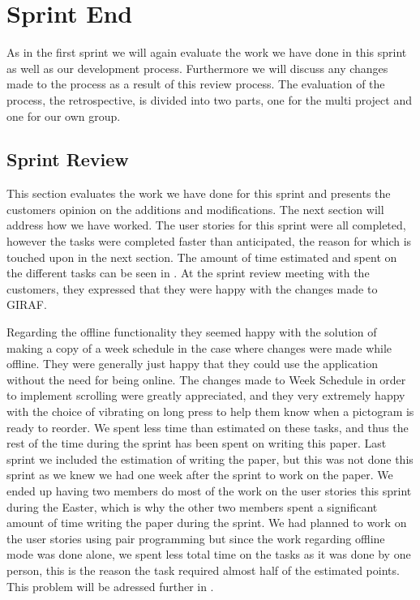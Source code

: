 \chapter{Sprint End}
As in the first sprint we will again evaluate the work we have done in this sprint as well as our development process.
Furthermore we will discuss any changes made to the process as a result of this review process.
The evaluation of the process, the retrospective, is divided into two parts, one for the multi project and one for our own group.
\section{Sprint Review}
This section evaluates the work we have done for this sprint and presents the customers opinion on the additions and modifications.
The next section will address how we have worked.
The user stories for this sprint were all completed, however the tasks were completed faster than anticipated, the reason for which is touched upon in the next section.
The amount of time estimated and spent on the different tasks can be seen in . 
At the sprint review meeting with the customers, they expressed that they were happy with the changes made to GIRAF. \

Regarding the offline functionality they seemed happy with the solution of making a copy of a week schedule in the case where changes were made while offline. 
They were generally just happy that they could use the application without the need for being online.
The changes made to Week Schedule in order to implement scrolling were greatly appreciated, and they very extremely happy with the choice of vibrating on long press to help them know when a pictogram is ready to reorder.  
We spent less time than estimated on these tasks, and thus the rest of the time during the sprint has been spent on writing this paper.
Last sprint we included the estimation of writing the paper, but this was not done this sprint as we knew we had one week after the sprint to work on the paper.
We ended up having two members do most of the work on the user stories this sprint during the Easter, which is why the other two members spent a significant amount of time writing the paper during the sprint.
We had planned to work on the user stories using pair programming but since the work regarding offline mode was done alone, we spent less total time on the tasks as it was done by one person, this is the reason the task required almost half of the estimated points. 
This problem will be adressed further in .

